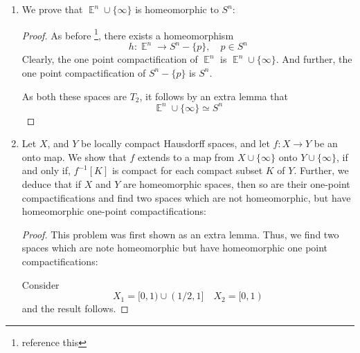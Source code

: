 \documentclass{book}
\DeclareMathOperator*{\E}{\mathbb{E}}
\begin{document}
\begin{enumerate}[(1)]
\begin{proof}
            \par  We now show $X\cup\{\infty\}$ is Hausdorff.  Let $x,y\in X\cup\{\infty\}$.  If $x,y\in X$ then since $X$ itself is Hausdorff we know there are open sets that separate them.  So suppose without loss of generality that $y=\infty$.  Since $X$ is locally compact there is an open set $U\subseteq X$ and a compact set $K\subseteq X$ with $x\in U\subseteq K$.  Then $\infty\in K^c$ is an open set in $X\cup\{\infty\}$ and $K^c\cap U=\emptyset$.

            \par  It remains to show $X$ is dense in $X\cup\{\infty\}$.  The only way this is not true is if $\{\infty\}$ is an open set.  But $\{\infty\}^c=X$ which was assumed to be {\it not} compact.
        \end{proof}

    \item We prove that $\E^n \cup \{\infty \}$ is homeomorphic to $S^n$:
        \begin{proof} As before \footnote{reference this}, there exists a homeomorphism 
            \[h: {\E}^n \rightarrow S^n- \{p\}, \quad p \in S^n\]
            Clearly, the one point compactification of $\E^n$ is $\E^n \cup \{\infty \}$.  And further, the one point compactification of $S^n- \{p\}$ is $S^n$. 
            \par As both these spaces are $T_2$, it follows by an extra lemma that 
            \[ {\E}^n \cup \{\infty \} \simeq S^n \]
        \end{proof}

    \item Let $X$, and $Y$ be locally compact Hausdorff spaces, and let $f: X \rightarrow Y$ be an onto map. We show that $f$ extends to a map from $X \cup \{\infty\}$ onto $Y \cup \{\infty\}$, if and only if, $f^{-1}[K]$ is compact for each compact subset $K$ of $Y$. Further, we deduce that if $X$ and $Y$ are homeomorphic spaces, then so are their one-point compactifications and find two spaces which are not homeomorphic, but have homeomorphic one-point compactifications:
        \begin{proof} This problem was first shown as an extra lemma. Thus, we find two spaces which are note homeomorphic but have homeomorphic one point compactifications: 
            \par Consider 
            \[X_1 = [0,1) \cup (1/2, 1] \quad X_2 = [0,1) \]
            and the result follows. 
        \end{proof}



\end{enumerate}
\end{document}
